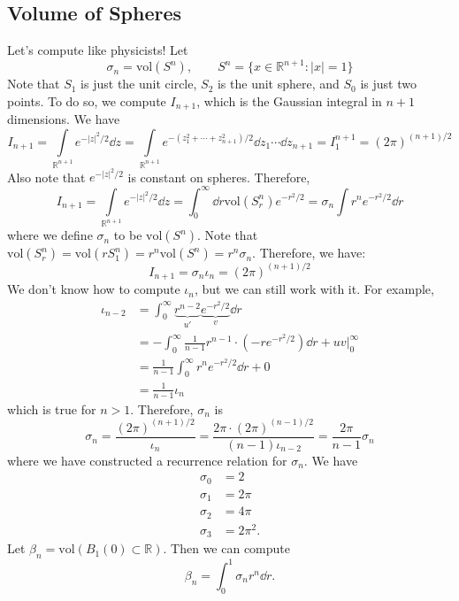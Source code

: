 \documentclass{article}
\numberwithin{equation}{section}
\begin{document}
\subsection{Volume of Spheres}
Let's compute like physicists! Let
\begin{equation}
    \sigma_n = \text{vol}(S^n),\quad\quad S^n = \{x \in \mathbb{R}^{n+1}: |x|=1\}
\end{equation}
Note that $S_1$ is just the unit circle, $S_2$ is the unit sphere, and $S_0$ is just two points. To do so, we compute $I_{n+1}$, which is the Gaussian integral in $n+1$ dimensions. We have 
\begin{equation}
    I_{n+1} = \int\limits_{\mathbb{R}^{n+1}} e^{-|z|^2/2} \dd{z} = \int\limits_{\mathbb{R}^{n+1}} e^{-(z_1^2+\cdots+z_{n+1}^2)/2}\dd{z}_1\cdots \dd{z}_{n+1} = I_1^{n+1} = \left(2\pi\right)^{(n+1)/2}
\end{equation}
Also note that $e^{-|z|^2/2}$ is constant on spheres. Therefore, 
\begin{equation}
    I_{n+1} = \int\limits_{\mathbb{R}^{n+1}}e^{-|z|^2/2}\dd{z} = \int_0^\infty \dd{r} \text{vol}(S^n_r)e^{-r^2/2} = \sigma_n \int r^n e^{-r^2/2} \dd{r}
\end{equation}
where we define $\sigma_n$ to be $\text{vol}(S^n)$. Note that $\text{vol}(S_r^n) = \text{vol}(rS_1^n)=r^n\text{vol}(S^n) = r^n \sigma_n.$ Therefore, we have:
\begin{equation}
    I_{n+1} = \sigma_n \iota_n = (2\pi)^{(n+1)/2}
\end{equation}
We don't know how to compute $\iota_n$, but we can still work with it. For example, 
\begin{align}
    \iota_{n-2} &= \int_0^\infty \underbrace{r^{n-2}}_{u'}\underbrace{e^{-r^2/2}}_{v}\dd{r} \\ 
    &= -\int_0^\infty \frac{1}{n-1}r^{n-1} \cdot \left(-re^{-r^2/2}\right) \dd{r}  + uv\Big|_0^\infty \\ 
    &= \frac{1}{n-1} \int_0^\infty r^n e^{-r^2/2}\dd{r} + 0 \\
    &= \frac{1}{n-1}\iota_n 
\end{align}
which is true for $n>1.$ Therefore, $\sigma_n$ is
\begin{equation}
    \sigma_n = \frac{(2\pi)^{(n+1)/2}}{\iota_n} = \frac{2\pi \cdot (2\pi)^{(n-1)/2}}{(n-1)\iota_{n-2}} = \frac{2\pi}{n-1}\sigma_n 
\end{equation}
where we have constructed a recurrence relation for $\sigma_n$. We have
\begin{align}
    \sigma_0 &= 2 \\ 
    \sigma_1 &= 2\pi \\ 
    \sigma_2 &= 4\pi \\
    \sigma_3 &= 2\pi^2.
\end{align}
Let $\beta_n = \text{vol}(B_1(0) \subset \mathbb{R}).$ Then we can compute
\begin{equation}
    \beta_n = \int_0^1 \sigma_nr^n \dd{r}.
\end{equation}
\end{document}
